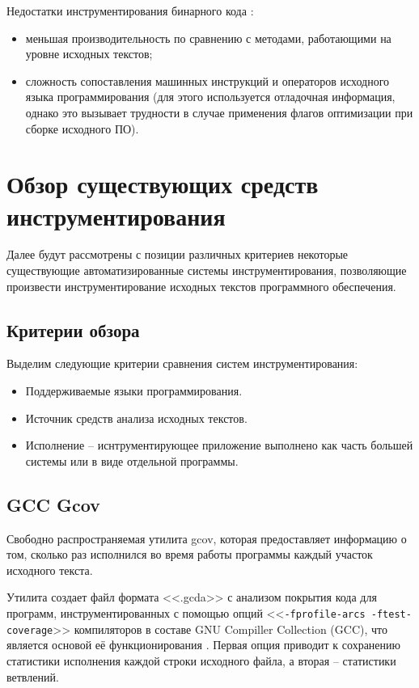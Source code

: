 Недостатки инструментирования бинарного кода \cite{lomakina2016testirovanie}:
\begin{itemize}[noitemsep]
  \item меньшая производительность по сравнению с методами, работающими на уровне исходных текстов;
  \item сложность сопоставления машинных инструкций и операторов исходного языка программирования (для этого используется отладочная информация, однако это вызывает трудности в случае применения флагов оптимизации при сборке исходного ПО).
\end{itemize}

\section{Обзор существующих средств инструментирования}

Далее будут рассмотрены с позиции различных критериев некоторые существующие автоматизированные системы инструментирования, позволяющие произвести инструментирование исходных текстов программного обеспечения.

\subsection{Критерии обзора}

Выделим следующие критерии сравнения систем инструментирования:
\begin{itemize}[noitemsep]
  \item Поддерживаемые языки программирования.
  \item Источник средств анализа исходных текстов.
  \item Исполнение -- иснтрументирующее приложение выполнено как часть большей системы или в виде отдельной программы.
\end{itemize}

\subsection{GCC Gcov}
Свободно распространяемая утилита gcov, которая предоставляет информацию о том, сколько раз исполнился во время работы программы каждый участок исходного текста.

Утилита создает файл формата <<.gcda>> с анализом покрытия кода для программ, инструментированных с помощью опций <<\lstinline{-fprofile-arcs -ftest-coverage}>> компиляторов в составе GNU Compiller Collection (GCC), что является основой её функционирования \cite{reviewGCCGcov}. Первая опция приводит к сохранению статистики исполнения каждой строки исходного файла, а вторая -- статистики ветвлений.

